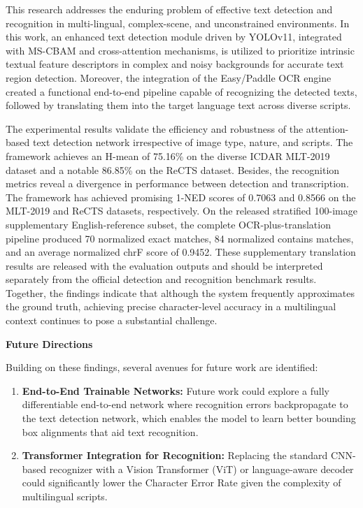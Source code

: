 \documentclass{ieeeaccess}
\begin{document}
{This research addresses the enduring problem of effective text detection and recognition in multi-lingual, complex-scene, and unconstrained environments. In this work, an enhanced text detection module driven by YOLOv11, integrated with MS-CBAM and cross-attention mechanisms, is utilized to prioritize intrinsic textual feature descriptors in complex and noisy backgrounds for accurate text region detection. Moreover, the integration of the Easy/Paddle OCR engine created a functional end-to-end pipeline capable of recognizing the detected texts, followed by translating them into the target language text across diverse scripts.\par
The experimental results validate the efficiency and robustness of the attention-based text detection network irrespective of image type, nature, and scripts. The framework achieves an H-mean of 75.16\% on the diverse ICDAR MLT-2019 dataset and a notable 86.85\% on the ReCTS dataset. Besides, the recognition metrics reveal a divergence in performance between detection and transcription. The framework has achieved promising 1-NED scores of 0.7063 and 0.8566 on the MLT-2019 and ReCTS datasets, respectively. On the released stratified 100-image supplementary English-reference subset, the complete OCR-plus-translation pipeline produced 70 normalized exact matches, 84 normalized contains matches, and an average normalized chrF score of 0.9452. These supplementary translation results are released with the evaluation outputs and should be interpreted separately from the official detection and recognition benchmark results. Together, the findings indicate that although the system frequently approximates the ground truth, achieving precise character-level accuracy in a multilingual context continues to pose a substantial challenge.

\noindent\textbf{Future Directions}

Building on these findings, several avenues for future work are identified:

\begin{enumerate}
  \item \textbf{End-to-End Trainable Networks:} Future work could explore a fully differentiable end-to-end network where recognition errors backpropagate to the text detection network, which enables the model to learn better bounding box alignments that aid text recognition.

  \item \textbf{Transformer Integration for Recognition:} Replacing the
  standard CNN-based recognizer with a Vision Transformer (ViT) or
  language-aware decoder could significantly lower the Character Error Rate given the complexity of multilingual scripts.


\end{enumerate}}
\end{document}
